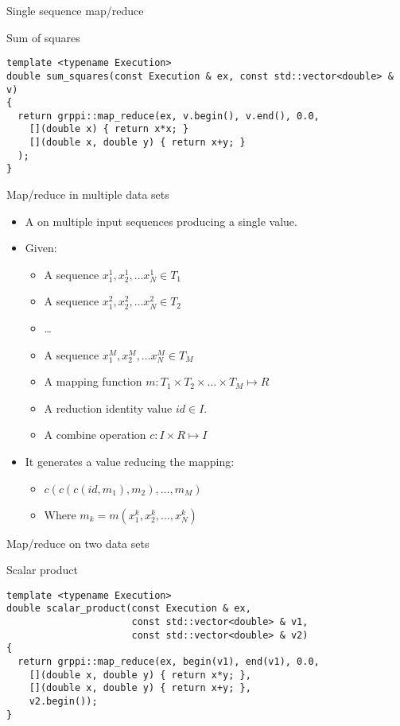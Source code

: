 \begin{frame}[t,fragile]{Single sequence map/reduce}
\begin{block}{Sum of squares}
\begin{lstlisting}
template <typename Execution>
double sum_squares(const Execution & ex, const std::vector<double> & v)
{
  return grppi::map_reduce(ex, v.begin(), v.end(), 0.0,
    [](double x) { return x*x; }
    [](double x, double y) { return x+y; }
  );
}
\end{lstlisting}
\end{block}
\end{frame}

\begin{frame}[t]{Map/reduce in multiple data sets}
\begin{itemize}
  \item A  on multiple input sequences producing a single value.
  \vfill\pause
  \item Given:
    \begin{itemize}
      \item A sequence $x^1_1, x^1_2, \ldots x^1_N \in T_1$
      \item A sequence $x^2_1, x^2_2, \ldots x^2_N \in T_2$
      \item \ldots
      \item A sequence $x^M_1, x^M_2, \ldots x^M_N \in T_M$
      \item A mapping function $m : T_1 \times T_2 \times \ldots \times T_M \mapsto R$
      \item A reduction identity value $id \in I$.
      \item A combine operation $c : I \times R \mapsto I$
    \end{itemize}
  \vfill\pause
  \item It generates a value reducing the mapping:
    \begin{itemize}
      \item $c(c(c(id,m_1),m_2), \ldots, m_M)$
      \item Where $m_k = m(x^k_1, x^k_2, \ldots, x^k_N)$
    \end{itemize}
\end{itemize}
\end{frame}

\begin{frame}[t,fragile]{Map/reduce on two data sets}
\begin{block}{Scalar product}
\begin{lstlisting}
template <typename Execution>
double scalar_product(const Execution & ex,
                      const std::vector<double> & v1,
                      const std::vector<double> & v2)
{
  return grppi::map_reduce(ex, begin(v1), end(v1), 0.0,
    [](double x, double y) { return x*y; },
    [](double x, double y) { return x+y; },
    v2.begin());
}
\end{lstlisting}
\end{block}
\end{frame}

